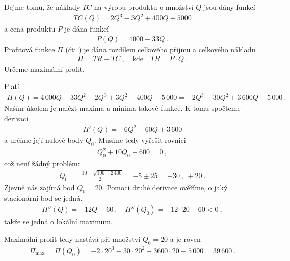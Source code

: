 \begin{example}
    Dejme tomu, že náklady $TC$ na výrobu produktu o množství $Q$ jsou dány funkcí 
    \begin{align}
        TC (Q) = 2 Q^3 - 3 Q^2 + 400 Q + 5000 
    \end{align}
    a cena produktu $P$ je dána funkcí \begin{align}
        P(Q) =  4000 - 33 Q \:.
    \end{align}
    Profitová funkce $\Pi$ (čti ) je dána rozdílem celkového příjmu a celkového nákladu
    \begin{align}
        \Pi = TR - TC \:, \quad \text{kde} \quad TR = P \cdot Q \:.
    \end{align} 
    Určeme maximální profit.

    Platí \begin{align}
        \Pi(Q) = 4\,000 Q - 33 Q^2 - 2 Q^3 + 3 Q^2 - 400 Q - 5\,000 = - 2 Q^3 - 30 Q^2 + 3\,600 Q - 5\,000\:.
    \end{align}
    Naším úkolem je nalézt maxima a minima takové funkce. K tomu spočteme derivaci
    \begin{align}
        \Pi'(Q) = - 6Q^2 - 60 Q + 3\,600
    \end{align}
    a určíme její nulové body $Q_0$. Musíme tedy vyřešit rovnici 
    \begin{align}
        Q_0^2 + 10 Q_0 - 600 = 0\:,
    \end{align}
    což není žádný problém:
    \begin{align}
        Q_0 = \frac{-10 \pm \sqrt{100 + 2\,400}}{2} = - 5 \pm 25 = -30 \:, \: +20 \:. 
    \end{align}
    Zjevně nás zajímá bod $Q_0 = 20$. Pomocí druhé derivace ověříme, o jaký stacionární bod se jedná.
    \begin{align}
        \Pi''(Q) = - 12 Q - 60 \:, \quad \Pi''(Q_0) = - 12 \cdot 20 - 60 < 0 \:,
    \end{align}
    takže se jedná o lokální maximum.

    Maximální profit tedy nastává při množství $Q_0 = 20$ a je roven 
    \begin{align}
        \Pi_{\text{max}} 
    = \Pi(Q_0) = -2 \cdot 20^3 - 30 \cdot 20^2 + 3600 \cdot 20 - 5\,000 = 39\,600 \:.
    \end{align}
\end{example}